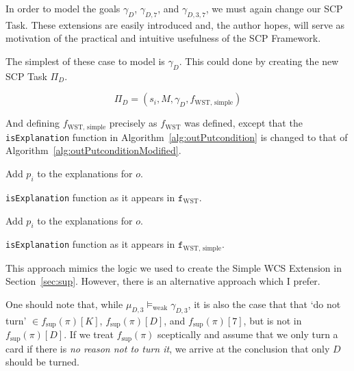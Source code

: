 
In order to model the goals $\gamma_{D}$, $\gamma_{D,7}$, and $\gamma_{D,3,7}$, we must again change our SCP Task. These extensions are easily introduced and, the author hopes, will serve as motivation of the practical and intuitive usefulness of the SCP Framework.

The simplest of these case to model is  $\gamma_{D}$. This could done by creating the new SCP Task $\Pi_D$.

\[
\Pi_D = (s_i, M, \gamma_D, f_\text{WST, simple})
\]

And defining $f_\text{WST, simple}$ precisely as $f_\text{WST}$ was defined, except that the \texttt{isExplanation} function in Algorithm~\ref{alg:outPutcondition} is changed to that of 
Algorithm~\ref{alg:outPutconditionModified}.

\begin{algorithm}[H] 
\SetAlgoLined
{}
{
{
Add $p_i$ to the explanations for $o$.
}
}
\caption{\texttt{isExplanation} function as it appears in $\texttt{f}_\text{WST}$.}
\label{alg:outPutcondition}
\end{algorithm}

\begin{algorithm}[H] 
\SetAlgoLined
{}
{
{
Add $p_i$ to the explanations for $o$.
}
}
\caption{\texttt{isExplanation} function as it appears in $\texttt{f}_\text{WST, simple}$.}
\label{alg:outPutconditionModified}
\end{algorithm}

This approach mimics the logic we used to create the Simple WCS Extension in Section~\ref{sec:sup}. However, there is an alternative approach which I prefer. 

One should note that, while $\mu_{D,3}\models_\text{weak} \gamma_{D,3}$, it is also the case that that `do not turn' $\in f_\text{sup}(\pi)[K]$, $f_\text{sup}(\pi)[D]$, and $ f_\text{sup}(\pi)[7]$, but is not in $ f_\text{sup}(\pi)[D]$. If we treat $f_\text{sup}(\pi)$ sceptically and assume that we only turn a card if there is \textit{no reason not to turn it}, we arrive at the conclusion that only $D$ should be turned.


